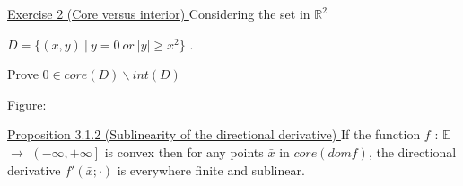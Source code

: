 \documentclass[a4paper,11pt]{jsarticle}
\begin{document}
\begin{itembox}[l]{\underline{Exercise 2 (Core versus interior) }}
  Considering the set in $\mathbb{R}^2$

  \begin{center}
    $D=\{(x,y) \:|\: y = 0 \:or\: |y| \geq x^2 \}$ .
  \end{center}

  Prove $0 \in core (D) \backslash int (D) $
\end{itembox}

Figure:


\begin{itembox}[l]{\underline{Proposition 3.1.2 (Sublinearity of the directional derivative) }}
  If the function $f$ : $\mathbb{E}$ $\to$ $ \left ( -\infty ,+\infty \right ] $ is convex then for any points $\bar{x}$ in $core(dom f)$, the directional derivative $f'(\bar{x};\cdot)$ is everywhere finite and sublinear.
\end{itembox}
\end{document}
